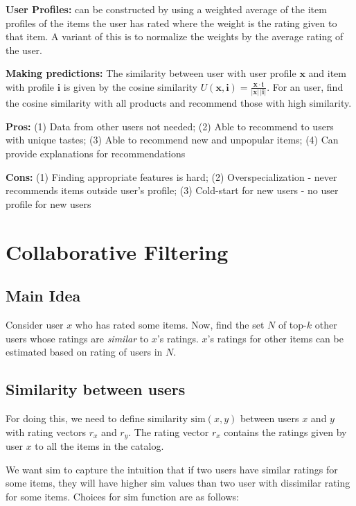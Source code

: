 \documentclass{article}
\newcommand{\Sim}{\text{sim}}
\begin{document}
\textbf{User Profiles:} can be constructed by using a weighted average of the item profiles of the items the user has rated where the weight is the rating given to that item. A variant of this is to normalize the weights by the average rating of the user.

\textbf{Making predictions:} 
The similarity between user with user profile $\mathbf{x}$ and item with profile $\mathbf{i}$ is given by the cosine similarity $U(\mathbf{x},\mathbf{i}) = \frac{\mathbf{x}\cdot\mathbf{i}}{|\mathbf{x}|\,|\mathbf{i}|}$. For an user, find the cosine similarity with all products and recommend those with high similarity.

\textbf{Pros:} (1) Data from other users not needed; (2) Able to recommend to users with unique tastes; (3) Able to recommend new and unpopular items; (4) Can provide explanations for recommendations

\textbf{Cons:} (1) Finding appropriate features is hard; (2) Overspecialization - never recommends items outside user's profile; (3) Cold-start for new users - no user profile for new users

\section{Collaborative Filtering}
\subsection{Main Idea} 

Consider user $x$ who has rated some items. Now, find the set $N$ of top-$k$ other users whose ratings are \textit{similar} to $x$'s ratings. $x$'s ratings for other items can be estimated based on rating of users in $N$.

\subsection{Similarity between users}

For doing this, we need to define similarity $\Sim(x, y)$ between users $x$ and $y$ with rating vectors $r_x$ and $r_y$. The rating vector $r_x$ contains the ratings given by user $x$ to all the items in the catalog.

We want $\Sim$ to capture the intuition that if two users have similar ratings for some items, they will have higher $\Sim$ values than two user with dissimilar rating for some items. Choices for $\Sim$ function are as follows:
\end{document}
